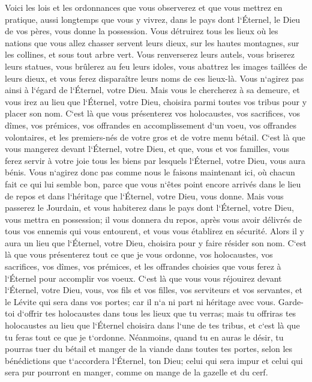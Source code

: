 \verse Voici les lois et les ordonnances que vous observerez et que vous mettrez en pratique, aussi longtemps que vous y vivrez, dans le pays dont l`Éternel, le Dieu de vos pères, vous donne la possession. 
\verse Vous détruirez tous les lieux où les nations que vous allez chasser servent leurs dieux, sur les hautes montagnes, sur les collines, et sous tout arbre vert. 
\verse Vous renverserez leurs autels, vous briserez leurs statues, vous brûlerez au feu leurs idoles, vous abattrez les images taillées de leurs dieux, et vous ferez disparaître leurs noms de ces lieux-là. 
\verse Vous n`agirez pas ainsi à l`égard de l`Éternel, votre Dieu. 
\verse Mais vous le chercherez à sa demeure, et vous irez au lieu que l`Éternel, votre Dieu, choisira parmi toutes vos tribus pour y placer son nom. 
\verse C`est là que vous présenterez vos holocaustes, vos sacrifices, vos dîmes, vos prémices, vos offrandes en accomplissement d`un voeu, vos offrandes volontaires, et les premiers-nés de votre gros et de votre menu bétail. 
\verse C`est là que vous mangerez devant l`Éternel, votre Dieu, et que, vous et vos familles, vous ferez servir à votre joie tous les biens par lesquels l`Éternel, votre Dieu, vous aura bénis. 
\verse Vous n`agirez donc pas comme nous le faisons maintenant ici, où chacun fait ce qui lui semble bon, 
\verse parce que vous n`êtes point encore arrivés dans le lieu de repos et dans l`héritage que l`Éternel, votre Dieu, vous donne. 
\verse Mais vous passerez le Jourdain, et vous habiterez dans le pays dont l`Éternel, votre Dieu, vous mettra en possession; il vous donnera du repos, après vous avoir délivrés de tous vos ennemis qui vous entourent, et vous vous établirez en sécurité. 
\verse Alors il y aura un lieu que l`Éternel, votre Dieu, choisira pour y faire résider son nom. C`est là que vous présenterez tout ce que je vous ordonne, vos holocaustes, vos sacrifices, vos dîmes, vos prémices, et les offrandes choisies que vous ferez à l`Éternel pour accomplir vos voeux. 
\verse C`est là que vous vous réjouirez devant l`Éternel, votre Dieu, vous, vos fils et vos filles, vos serviteurs et vos servantes, et le Lévite qui sera dans vos portes; car il n`a ni part ni héritage avec vous. 
\verse Garde-toi d`offrir tes holocaustes dans tous les lieux que tu verras; 
\verse mais tu offriras tes holocaustes au lieu que l`Éternel choisira dans l`une de tes tribus, et c`est là que tu feras tout ce que je t`ordonne. 
\verse Néanmoins, quand tu en auras le désir, tu pourras tuer du bétail et manger de la viande dans toutes tes portes, selon les bénédictions que t`accordera l`Éternel, ton Dieu; celui qui sera impur et celui qui sera pur pourront en manger, comme on mange de la gazelle et du cerf. 
